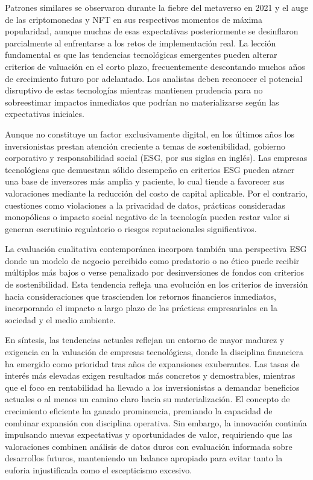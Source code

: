 Patrones similares se observaron durante la fiebre del metaverso en 2021 y el auge de las criptomonedas y NFT en sus respectivos momentos de máxima popularidad, aunque muchas de esas expectativas posteriormente se desinflaron parcialmente al enfrentarse a los retos de implementación real. La lección fundamental es que las tendencias tecnológicas emergentes pueden alterar criterios de valuación en el corto plazo, frecuentemente descontando muchos años de crecimiento futuro por adelantado. Los analistas deben reconocer el potencial disruptivo de estas tecnologías mientras mantienen prudencia para no sobreestimar impactos inmediatos que podrían no materializarse según las expectativas iniciales.

Aunque no constituye un factor exclusivamente digital, en los últimos años los inversionistas prestan atención creciente a temas de sostenibilidad, gobierno corporativo y responsabilidad social (ESG, por sus siglas en inglés). Las empresas tecnológicas que demuestran sólido desempeño en criterios ESG pueden atraer una base de inversores más amplia y paciente, lo cual tiende a favorecer sus valoraciones mediante la reducción del costo de capital aplicable. Por el contrario, cuestiones como violaciones a la privacidad de datos, prácticas consideradas monopólicas o impacto social negativo de la tecnología pueden restar valor si generan escrutinio regulatorio o riesgos reputacionales significativos.

La evaluación cualitativa contemporánea incorpora también una perspectiva ESG donde un modelo de negocio percibido como predatorio o no ético puede recibir múltiplos más bajos o verse penalizado por desinversiones de fondos con criterios de sostenibilidad. Esta tendencia refleja una evolución en los criterios de inversión hacia consideraciones que trascienden los retornos financieros inmediatos, incorporando el impacto a largo plazo de las prácticas empresariales en la sociedad y el medio ambiente.

En síntesis, las tendencias actuales reflejan un entorno de mayor madurez y exigencia en la valuación de empresas tecnológicas, donde la disciplina financiera ha emergido como prioridad tras años de expansiones exuberantes. Las tasas de interés más elevadas exigen resultados más concretos y demostrables, mientras que el foco en rentabilidad ha llevado a los inversionistas a demandar beneficios actuales o al menos un camino claro hacia su materialización. El concepto de crecimiento eficiente ha ganado prominencia, premiando la capacidad de combinar expansión con disciplina operativa. Sin embargo, la innovación continúa impulsando nuevas expectativas y oportunidades de valor, requiriendo que las valoraciones combinen análisis de datos duros con evaluación informada sobre desarrollos futuros, manteniendo un balance apropiado para evitar tanto la euforia injustificada como el escepticismo excesivo. 